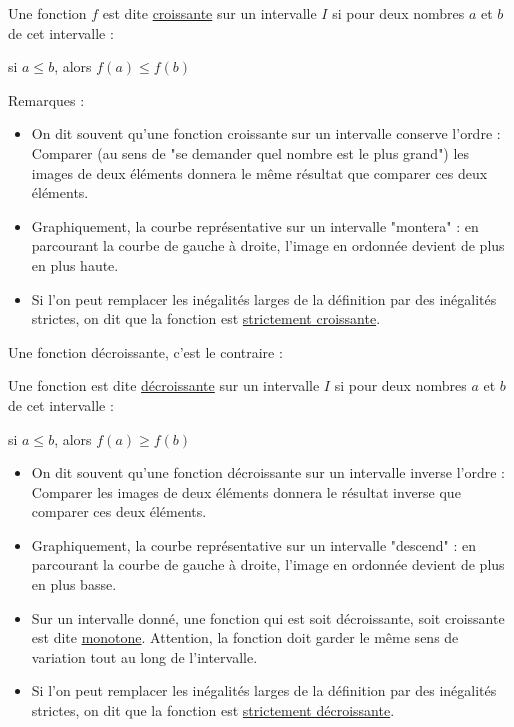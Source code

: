 \documentclass[10pt,a4paper]{book}
\begin{document}
\begin{de}
    Une fonction $f$ est dite \underline{croissante} sur un intervalle $I$ si pour deux nombres $a$ et $b$ de cet intervalle :
    \vspace{0.3cm}
    \begin{center}
    si $a \leq b$,  alors $f(a) \leq f(b)$
    \end{center}
\end{de}

Remarques :
\begin{itemize}
    \item On dit souvent qu'une fonction croissante sur un intervalle conserve l'ordre : Comparer (au sens de "se demander quel nombre est le plus grand") les images de deux éléments donnera le même résultat que comparer ces deux éléments.
    \item Graphiquement, la courbe représentative sur un intervalle "montera" : en parcourant la courbe de gauche à droite, l'image en ordonnée devient de plus en plus haute.
    \item Si l'on peut remplacer les inégalités larges de la définition par des inégalités strictes, on dit que la fonction est \underline{strictement croissante}.
\end{itemize}

Une fonction décroissante, c'est le contraire :

\begin{de}
    Une fonction est dite \underline{décroissante} sur un intervalle $I$ si pour deux nombres $a$ et $b$ de cet intervalle :
    \vspace{0.3cm}
    \begin{center}
    si $a \leq b$,  alors $f(a) \geq f(b)$
    \end{center}
\end{de}

\begin{itemize}
    \item On dit souvent qu'une fonction décroissante sur un intervalle inverse l'ordre : Comparer les images de deux éléments donnera le résultat inverse que comparer ces deux éléments.
    \item Graphiquement, la courbe représentative sur un intervalle "descend" : en parcourant la courbe de gauche à droite, l'image en ordonnée devient de plus en plus basse.
    \item Sur un intervalle donné, une fonction qui est soit décroissante, soit croissante est dite \underline{monotone}. Attention, la fonction doit garder le même sens de variation tout au long de l'intervalle.
    \item Si l'on peut remplacer les inégalités larges de la définition par des inégalités strictes, on dit que la fonction est \underline{strictement décroissante}.
\end{itemize}
\end{document}
